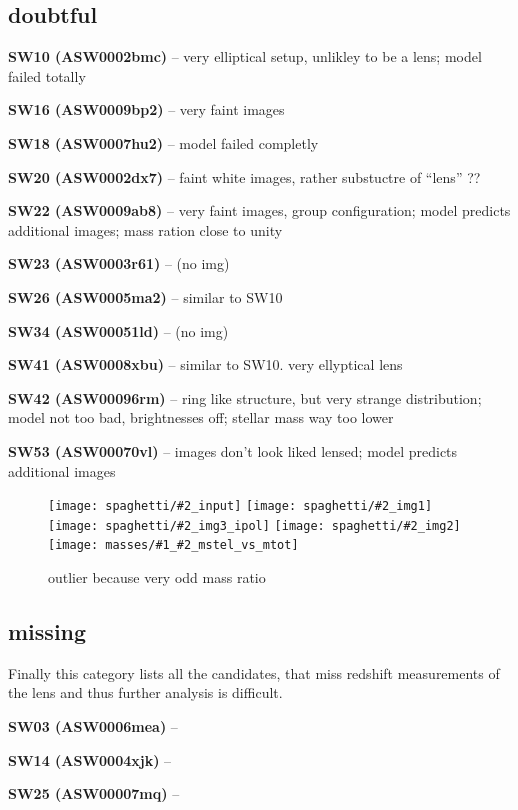 \documentclass[fleqn,usenatbib]{mnras}
\newcommand{\inclfig}[2]{
  \centering
	\texttt{[image: spaghetti/\#2\_input]}%
	\texttt{[image: spaghetti/\#2\_img1]}
	\texttt{[image: spaghetti/\#2\_img3\_ipol]}%
	\texttt{[image: spaghetti/\#2\_img2]}
	\texttt{[image: masses/\#1\_\#2\_mstel\_vs\_mtot]}
}
\newcommand{\lenstitle}[1]{\noindent\textbf{#1} --}
\begin{document}
\subsection{doubtful}

\lenstitle{SW10 (ASW0002bmc)} 
  very elliptical setup, unlikley to be a lens;
  model failed totally
  
\lenstitle{SW16 (ASW0009bp2)} 
  very faint images
  
\lenstitle{SW18 (ASW0007hu2)} 
  model failed completly
  
\lenstitle{SW20 (ASW0002dx7)} 
  faint white images, rather substuctre of ``lens'' ??
  
\lenstitle{SW22 (ASW0009ab8)} 
  very faint images, group configuration;
  model predicts additional images;
  mass ration close to unity
  
\lenstitle{SW23 (ASW0003r61)} 
  (no img)
  
\lenstitle{SW26 (ASW0005ma2)} 
  similar to SW10
  
\lenstitle{SW34 (ASW00051ld)} 
  (no img)
  
\lenstitle{SW41 (ASW0008xbu)} 
  similar to SW10. very ellyptical lens
  
\lenstitle{SW42 (ASW00096rm)} 
  ring like structure, but very strange distribution;
  model not too bad, brightnesses off;
  stellar mass way too lower
  
\lenstitle{SW53 (ASW00070vl)} 
  images don't look liked lensed;
  model predicts additional images
  



\begin{figure}
  \inclfig{SW42}{ASW00096rm_4Q3YCEWGLN}
  \caption{outlier because very odd mass ratio}
  \label{fig:SW42}
\end{figure}







\subsection{missing}

Finally this category lists all the candidates, that miss redshift measurements of the lens and thus further analysis is difficult.

\lenstitle{SW03 (ASW0006mea)}

\lenstitle{SW14 (ASW0004xjk)}

\lenstitle{SW25 (ASW00007mq)}
\end{document}
